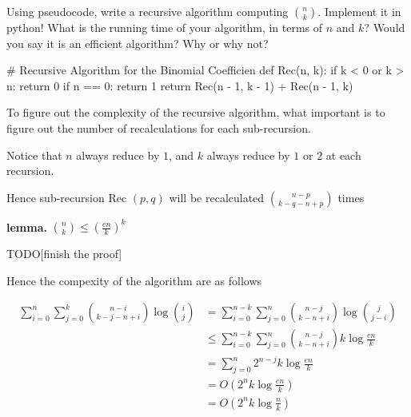 \documentclass[11pt,a4paper,oneside]{article}
\begin{document}
\begin{problem}{3} 
        Using pseudocode, write a recursive algorithm computing
        ${n \choose k}$. Implement it in python! What is 
        the running time of your algorithm, in terms of $n$ and $k$? Would you say it is an efficient
        algorithm? Why or why not?
    \solution
    \begin{python}
    	# Recursive Algorithm for the Binomial Coefficien
    	def Rec(n, k):
    	if k < 0 or k > n:
    	return 0
    	if n == 0:
    	return 1
    	return Rec(n - 1, k - 1) + Rec(n - 1, k)
    \end{python}
    
    To figure out the complexity of the recursive algorithm, what important is to figure out the number of recalculations for each sub-recursion.
    
    Notice that \( n \) always reduce by \( 1 \), and \( k \) always reduce by \( 1 \) or \( 2 \) at each recursion.
    
    Hence sub-recursion Rec \( (p, q) \) will be recalculated \( {n - p \choose k - q - n + p} \) times
    
    \textbf{lemma.}
    \({n \choose k} \leq (\frac{en}{k})^k\)
    
    TODO[finish the proof]
    
    Hence the compexity of the algorithm are as follows
    
    \[
	    \begin{split}
		    \sum_{i = 0}^{n} \sum_{j = 0}^k {n - i \choose k - j - n + i} \log{i \choose j} &= \sum_{i=0}^{n-k} \sum_{j=0}^n {n - j \choose k - n + i} \log{j \choose j - i} \\
		    &\leq \sum_{i=0}^{n-k} \sum_{j=0}^n {n - j \choose k - n + i} k\log{\frac{en}{k}} \\
		    &= \sum_{j=0}^n 2^{n-j} k \log{\frac{en}{k}} \\
		    &= O(2^{n}k \log{\frac{en}{k}}) \\
		    &= O(2^{n}k \log{\frac{n}{k}})
	    \end{split}
    \]
\end{problem}
\end{document}
